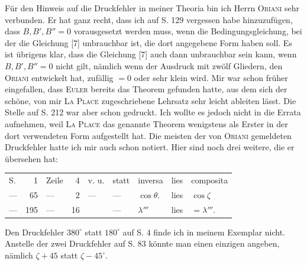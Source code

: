\par\indent Für den Hinweis auf die Druckfehler in meiner Theoria bin ich Herrn \textsc{Oriani} sehr verbunden. Er hat ganz recht, dass ich auf S. 129 vergessen habe hinzuzufügen, dass $B, B', B'' = 0$ vorausgesetzt
werden muss, wenn die Bedingungsgleichung, bei der die Gleichung [7] unbrauchbar ist, die dort angegebene Form haben soll. Es ist übrigens klar, dass die Gleichung [7] auch dann unbrauchbar sein kann, wenn $B, B', B''=0$ nicht gilt, nämlich wenn der Ausdruck mit zwölf Gliedern, den \textsc{Oriani} entwickelt hat, zufällig $=0$ oder sehr klein wird. Mir war schon früher eingefallen, dass \textsc{Euler} bereits das Theorem gefunden hatte, aus dem sich der schöne, von mir \textsc{La Place} zugeschriebene Lehrsatz sehr leicht ableiten lässt. Die Stelle auf S. 212 war aber schon gedruckt. Ich wollte es jedoch nicht in die Errata aufnehmen, weil \textsc{La Place} das genannte Theorem wenigstens als Erster in der dort verwendeten Form aufgestellt hat. Die meisten der von \textsc{Oriani} gemeldeten Druckfehler hatte ich mir auch schon notiert. Hier sind noch drei weitere, die er übersehen hat:

\begin{center}\fontsize{10}{12}\selectfont\setlength{\tabcolsep}{5pt}\renewcommand{\arraystretch}{1.15}\begin{tabular}{lrlrlllll}
S. & 1 & Zeile & 4 & v. u. & statt & inversa & lies & composita\\
--- & 65 & --- & 2 & --- & --- & $\cos\theta$. & lies & $\cos\zeta$\\
--- & 195 & --- & 16 &  & --- & $\lambda'''$ & lies & $=\lambda'''$.\\
\end{tabular}\end{center}

\par\indent Den Druckfehler $380^\circ$ statt $180^\circ$ auf S. 4 finde ich in meinem Exemplar nicht. Anstelle der zwei Druckfehler auf S. 83 könnte man einen einzigen angeben, nämlich $\zeta+45$ statt $\zeta-45^\circ$.
